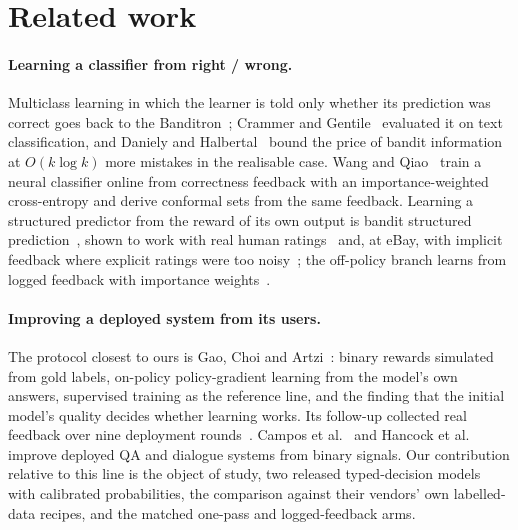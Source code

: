 \documentclass[11pt]{article}
\begin{document}
\section{Related work}

\paragraph{Learning a classifier from right / wrong.}
Multiclass learning in which the learner is told only whether its prediction was correct goes back to the Banditron~\citep{kakade2008banditron}; Crammer and Gentile~\citep{crammer2011multiclass} evaluated it on text classification, and Daniely and Halbertal~\citep{daniely2013price} bound the price of bandit information at $O(k \log k)$ more mistakes in the realisable case. Wang and Qiao~\citep{wang2024bccp} train a neural classifier online from correctness feedback with an importance-weighted cross-entropy and derive conformal sets from the same feedback. Learning a structured predictor from the reward of its own output is bandit structured prediction~\citep{sokolov2016bandit,kreutzer2017bandit,nguyen2017bandit}, shown to work with real human ratings~\citep{kreutzer2018reliability} and, at eBay, with implicit feedback where explicit ratings were too noisy~\citep{kreutzer2018ebay}; the off-policy branch learns from logged feedback with importance weights~\citep{swaminathan2015crm,dudik2011doubly,joachims2018banditnet,lawrence2018counterfactual}.

\paragraph{Improving a deployed system from its users.}
The protocol closest to ours is Gao, Choi and Artzi~\citep{gao2022simulating}: binary rewards simulated from gold labels, on-policy policy-gradient learning from the model's own answers, supervised training as the reference line, and the finding that the initial model's quality decides whether learning works. Its follow-up collected real feedback over nine deployment rounds~\citep{gao2023continually}. Campos et al.~\citep{campos2020feedback} and Hancock et al.~\citep{hancock2019feed} improve deployed QA and dialogue systems from binary signals. Our contribution relative to this line is the object of study, two released typed-decision models with calibrated probabilities, the comparison against their vendors' own labelled-data recipes, and the matched one-pass and logged-feedback arms.
\end{document}

